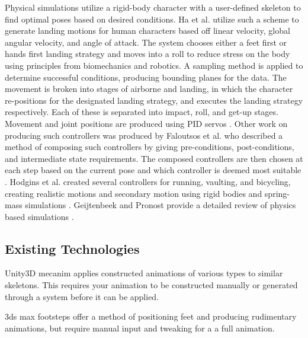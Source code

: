 		
Physical simulations utilize a rigid-body character with a user-defined skeleton to find optimal poses based on desired conditions.  Ha et al. utilize such a scheme to generate landing motions for human characters based off linear velocity, global angular velocity, and angle of attack.  The system chooses either a feet first or hands first landing strategy and moves into a roll to reduce stress on the body using principles from biomechanics and robotics.  A sampling method is applied to determine successful conditions, producing bounding planes for the data.  The movement is broken into stages of airborne and landing, in which the character re-positions for the designated landing strategy, and executes the landing strategy respectively. Each of these is separated into impact, roll, and get-up stages.  Movement and joint positions are produced using PID servos \cite{falling_landing}.  Other work on producing such controllers was produced by Faloutsos et al. who described a method of composing such controllers by giving pre-conditions, post-conditions, and intermediate state requirements.  The composed controllers are then chosen at each step based on the current pose and which controller is deemed most suitable \cite{composable_controllers}.  Hodgins et al. created several controllers for running, vaulting, and bicycling, creating realistic motions and secondary motion using rigid bodies and spring-mass simulations \cite{anim_human_athletics}.  Geijtenbeek and Pronost provide a detailed review of physics based simulations \cite{inter_physics_anim}.

\subsection{Existing Technologies}
Unity3D mecanim applies constructed animations of various types to similar skeletons.  This requires your animation to be constructed manually or generated through a system before it can be applied.

3ds max footsteps offer a method of positioning feet and producing rudimentary animations, but require manual input and tweaking for a a full animation.